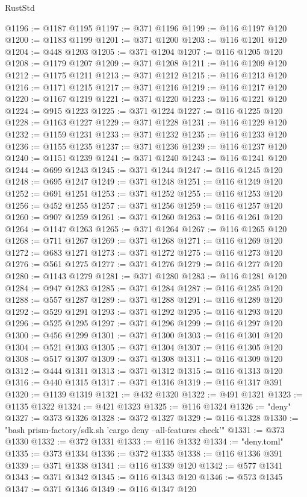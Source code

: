 \begin{lexlean}{RustStd}
\begin{coremodule}
@1196 := @1187 @1195
@1197 := @371 @1196
@1199 := @116 @1197 @120
@1200 := @1183 @1199
@1201 := @371 @1200
@1203 := @116 @1201 @120
@1204 := @448 @1203
@1205 := @371 @1204
@1207 := @116 @1205 @120
@1208 := @1179 @1207
@1209 := @371 @1208
@1211 := @116 @1209 @120
@1212 := @1175 @1211
@1213 := @371 @1212
@1215 := @116 @1213 @120
@1216 := @1171 @1215
@1217 := @371 @1216
@1219 := @116 @1217 @120
@1220 := @1167 @1219
@1221 := @371 @1220
@1223 := @116 @1221 @120
@1224 := @915 @1223
@1225 := @371 @1224
@1227 := @116 @1225 @120
@1228 := @1163 @1227
@1229 := @371 @1228
@1231 := @116 @1229 @120
@1232 := @1159 @1231
@1233 := @371 @1232
@1235 := @116 @1233 @120
@1236 := @1155 @1235
@1237 := @371 @1236
@1239 := @116 @1237 @120
@1240 := @1151 @1239
@1241 := @371 @1240
@1243 := @116 @1241 @120
@1244 := @699 @1243
@1245 := @371 @1244
@1247 := @116 @1245 @120
@1248 := @695 @1247
@1249 := @371 @1248
@1251 := @116 @1249 @120
@1252 := @691 @1251
@1253 := @371 @1252
@1255 := @116 @1253 @120
@1256 := @452 @1255
@1257 := @371 @1256
@1259 := @116 @1257 @120
@1260 := @907 @1259
@1261 := @371 @1260
@1263 := @116 @1261 @120
@1264 := @1147 @1263
@1265 := @371 @1264
@1267 := @116 @1265 @120
@1268 := @711 @1267
@1269 := @371 @1268
@1271 := @116 @1269 @120
@1272 := @683 @1271
@1273 := @371 @1272
@1275 := @116 @1273 @120
@1276 := @561 @1275
@1277 := @371 @1276
@1279 := @116 @1277 @120
@1280 := @1143 @1279
@1281 := @371 @1280
@1283 := @116 @1281 @120
@1284 := @947 @1283
@1285 := @371 @1284
@1287 := @116 @1285 @120
@1288 := @557 @1287
@1289 := @371 @1288
@1291 := @116 @1289 @120
@1292 := @529 @1291
@1293 := @371 @1292
@1295 := @116 @1293 @120
@1296 := @525 @1295
@1297 := @371 @1296
@1299 := @116 @1297 @120
@1300 := @456 @1299
@1301 := @371 @1300
@1303 := @116 @1301 @120
@1304 := @521 @1303
@1305 := @371 @1304
@1307 := @116 @1305 @120
@1308 := @517 @1307
@1309 := @371 @1308
@1311 := @116 @1309 @120
@1312 := @444 @1311
@1313 := @371 @1312
@1315 := @116 @1313 @120
@1316 := @440 @1315
@1317 := @371 @1316
@1319 := @116 @1317 @391
@1320 := @1139 @1319
@1321 := @432 @1320
@1322 := @491 @1321
@1323 := @1135 @1322
@1324 := @421 @1323
@1325 := @116 @1324
@1326 := "deny"
@1327 := @373 @1326
@1328 := @372 @1327
@1329 := @116 @1328
@1330 := "bash prism-factory/sdk.sh 'cargo deny --all-features check'"
@1331 := @373 @1330
@1332 := @372 @1331
@1333 := @116 @1332
@1334 := "deny.toml"
@1335 := @373 @1334
@1336 := @372 @1335
@1338 := @116 @1336 @391
@1339 := @371 @1338
@1341 := @116 @1339 @120
@1342 := @577 @1341
@1343 := @371 @1342
@1345 := @116 @1343 @120
@1346 := @573 @1345
@1347 := @371 @1346
@1349 := @116 @1347 @120

\end{coremodule}
\end{lexlean}
